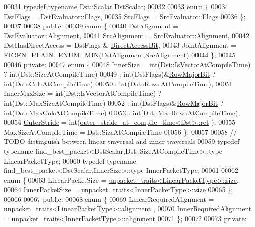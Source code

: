 \begin{DoxyCode}
00031   \textcolor{keyword}{typedef} \textcolor{keyword}{typename} Dst::Scalar DstScalar;
00032   
00033   \textcolor{keyword}{enum} \{
00034     DstFlags = DstEvaluator::Flags,
00035     SrcFlags = SrcEvaluator::Flags
00036   \};
00037   
00038 \textcolor{keyword}{public}:
00039   \textcolor{keyword}{enum} \{
00040     DstAlignment = DstEvaluator::Alignment,
00041     SrcAlignment = SrcEvaluator::Alignment,
00042     DstHasDirectAccess = DstFlags & \hyperlink{group__flags_gabf1e9d0516a933445a4c307ad8f14915}{DirectAccessBit},
00043     JointAlignment = EIGEN\_PLAIN\_ENUM\_MIN(DstAlignment,SrcAlignment)
00044   \};
00045 
00046 \textcolor{keyword}{private}:
00047   \textcolor{keyword}{enum} \{
00048     InnerSize = int(Dst::IsVectorAtCompileTime) ? int(Dst::SizeAtCompileTime)
00049               : int(DstFlags)&\hyperlink{group__flags_gae4f56c2a60bbe4bd2e44c5b19cbe8762}{RowMajorBit} ? int(Dst::ColsAtCompileTime)
00050               : int(Dst::RowsAtCompileTime),
00051     InnerMaxSize = int(Dst::IsVectorAtCompileTime) ? int(Dst::MaxSizeAtCompileTime)
00052               : int(DstFlags)&\hyperlink{group__flags_gae4f56c2a60bbe4bd2e44c5b19cbe8762}{RowMajorBit} ? int(Dst::MaxColsAtCompileTime)
00053               : int(Dst::MaxRowsAtCompileTime),
00054     \hyperlink{class_eigen_1_1_outer_stride}{OuterStride} = int(\hyperlink{struct_eigen_1_1internal_1_1outer__stride__at__compile__time}{outer\_stride\_at\_compile\_time<Dst>::ret}
      ),
00055     MaxSizeAtCompileTime = Dst::SizeAtCompileTime
00056   \};
00057 
00058   \textcolor{comment}{// TODO distinguish between linear traversal and inner-traversals}
00059   \textcolor{keyword}{typedef} \textcolor{keyword}{typename} find\_best\_packet<DstScalar,Dst::SizeAtCompileTime>::type LinearPacketType;
00060   \textcolor{keyword}{typedef} \textcolor{keyword}{typename} find\_best\_packet<DstScalar,InnerSize>::type InnerPacketType;
00061 
00062   \textcolor{keyword}{enum} \{
00063     LinearPacketSize = \hyperlink{struct_eigen_1_1internal_1_1unpacket__traits}{unpacket\_traits<LinearPacketType>::size},
00064     InnerPacketSize = \hyperlink{struct_eigen_1_1internal_1_1unpacket__traits}{unpacket\_traits<InnerPacketType>::size}
00065   \};
00066 
00067 \textcolor{keyword}{public}:
00068   \textcolor{keyword}{enum} \{
00069     LinearRequiredAlignment = \hyperlink{struct_eigen_1_1internal_1_1unpacket__traits}{unpacket\_traits<LinearPacketType>::alignment}
      ,
00070     InnerRequiredAlignment = \hyperlink{struct_eigen_1_1internal_1_1unpacket__traits}{unpacket\_traits<InnerPacketType>::alignment}
00071   \};
00072 
00073 \textcolor{keyword}{private}:

\end{DoxyCode}
